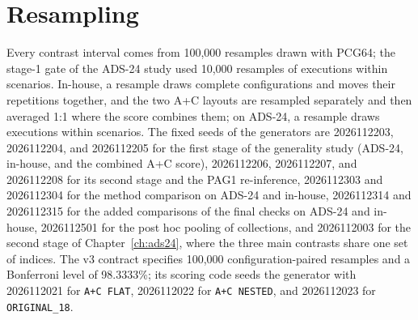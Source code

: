 
\section{Resampling}
\label{sec:repro-resampling}

Every contrast interval comes from 100,000 resamples drawn with PCG64;
the stage-1 gate of the ADS-24 study used 10,000 resamples of
executions within scenarios. In-house,
a resample draws complete configurations and moves their repetitions
together, and the two A+C layouts are resampled separately and then
averaged 1:1 where the score combines them; on ADS-24, a resample draws
executions within scenarios. The fixed seeds of the generators are
2026112203, 2026112204, and 2026112205 for the first stage of the
generality study (ADS-24, in-house, and the combined A+C score),
2026112206, 2026112207, and 2026112208 for its second stage and the
PAG1 re-inference, 2026112303 and 2026112304 for the method
comparison on ADS-24 and in-house, 2026112314 and 2026112315 for the
added comparisons of the final checks on ADS-24 and in-house,
2026112501 for the post hoc pooling of collections, and 2026112003 for
the second stage of Chapter~\ref{ch:ads24}, where the three main
contrasts share one set of indices. The v3 contract specifies 100,000 configuration-paired
resamples and a Bonferroni level of 98.3333\%; its scoring code seeds
the generator with 2026112021 for \texttt{A+C FLAT}, 2026112022 for
\texttt{A+C NESTED}, and 2026112023 for \texttt{ORIGINAL\_18}.


